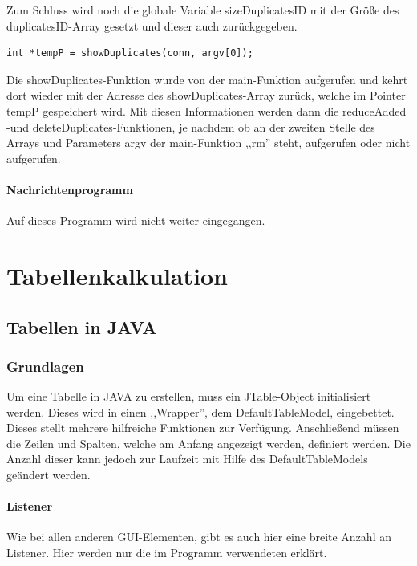 \documentclass[12pt]{report}
\begin{document}
\noindent Zum Schluss wird noch die globale Variable sizeDuplicatesID mit der Größe des duplicatesID-Array gesetzt und dieser auch zurückgegeben.\\


\begin{lstlisting}
int *tempP = showDuplicates(conn, argv[0]);
\end{lstlisting}

\noindent Die showDuplicates-Funktion wurde von der main-Funktion aufgerufen und kehrt dort wieder mit der Adresse des showDuplicates-Array zurück, welche im Pointer tempP gespeichert wird. Mit diesen Informationen werden dann die reduceAdded -und deleteDuplicates-Funktionen, je nachdem ob an der zweiten Stelle des Arrays und Parameters argv der main-Funktion ,,rm'' steht, aufgerufen oder nicht aufgerufen.


\subsection{Nachrichtenprogramm}
Auf dieses Programm wird nicht weiter eingegangen.








\part{Tabellenkalkulation}

\chapter{Tabellen in JAVA}

\section{Grundlagen}
Um eine Tabelle in JAVA zu erstellen, muss ein JTable-Object initialisiert werden. Dieses wird in einen ,,Wrapper'', dem DefaultTableModel, eingebettet. Dieses stellt mehrere hilfreiche Funktionen zur Verfügung. Anschließend müssen die Zeilen und Spalten, welche am Anfang angezeigt werden, definiert werden. Die Anzahl dieser kann jedoch zur Laufzeit mit Hilfe des DefaultTableModels geändert werden.

\subsection{Listener}
Wie bei allen anderen GUI-Elementen, gibt es auch hier eine breite Anzahl an Listener. Hier werden nur die im Programm verwendeten erklärt.
\end{document}
